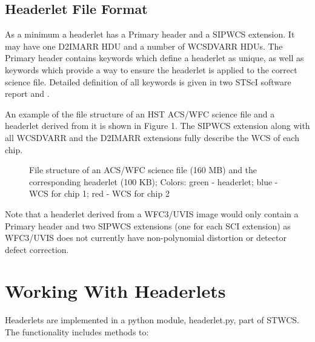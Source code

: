 \documentclass[11pt,twoside]{article}
\begin{document}
\subsection{Headerlet File Format}
As a minimum a headerlet has a Primary header
 and a SIPWCS extension. It may have one D2IMARR HDU and a number of
WCSDVARR HDUs. The Primary header contains keywords which define a headerlet as
unique, as well as keywords which provide a way to ensure the headerlet is 
applied to the correct science file. Detailed definition of all keywords is given in two STScI software report \citep{hack_fc} and \citep{hack_hlet}.

An example of the file structure of an HST ACS/WFC science
file and a headerlet derived from it is shown in Figure 1.
The SIPWCS extension along with all WCSDVARR and the D2IMARR extensions fully describe the WCS of each chip.

\begin{figure}[!h]
\caption{File structure of an ACS/WFC science file (160 MB) and the corresponding headerlet (100 KB); Colors: green - headerlet; blue - WCS for chip 1; red - WCS for chip 2}
\end{figure}

Note that a headerlet derived from a WFC3/UVIS image would only contain a 
Primary header and two SIPWCS extensions (one for each SCI extension) as
WFC3/UVIS does not currently have non-polynomial distortion or detector
defect correction.

\section{Working With Headerlets}
Headerlets are implemented in a python module, headerlet.py, part of STWCS. The functionality includes methods to:
\end{document}
